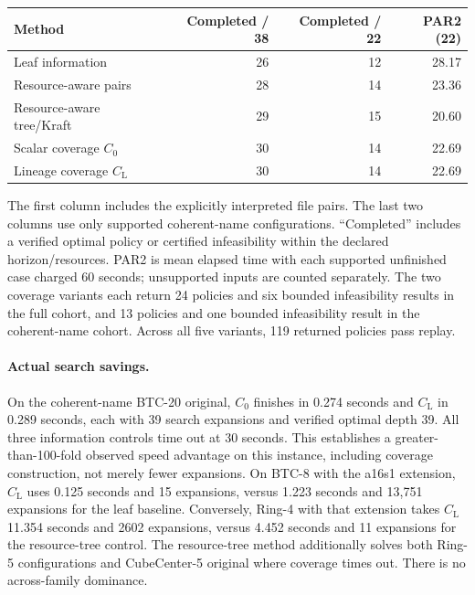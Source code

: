 \documentclass[11pt]{article}
\theoremstyle{definition}
\newcommand{\CL}{C_{\mathrm L}}
\begin{document}
\begin{center}
\begin{tabular}{lrrr}
\hline
Method & Completed / 38 & Completed / 22 & PAR2 (22) \\
\hline
Leaf information & 26 & 12 & 28.17 \\
Resource-aware pairs & 28 & 14 & 23.36 \\
Resource-aware tree/Kraft & 29 & 15 & 20.60 \\
Scalar coverage $C_0$ & 30 & 14 & 22.69 \\
Lineage coverage $\CL$ & 30 & 14 & 22.69 \\
\hline
\end{tabular}
\end{center}
The first column includes the explicitly interpreted file pairs. The last two
columns use only supported coherent-name configurations. ``Completed'' includes
a verified optimal policy or certified infeasibility within the declared
horizon/resources. PAR2 is mean elapsed time with each supported unfinished case
charged 60 seconds; unsupported inputs are counted separately. The two coverage
variants each return 24 policies and six bounded infeasibility results in the
full cohort, and 13 policies and one bounded infeasibility result in the
coherent-name cohort. Across all five variants, 119 returned policies pass replay.

\paragraph{Actual search savings.}
On the coherent-name BTC-20 original, $C_0$ finishes in 0.274 seconds and $\CL$
in 0.289 seconds, each with 39 search expansions and verified optimal depth 39.
All three information controls time out at 30 seconds. This establishes a
greater-than-100-fold observed speed advantage on this instance, including
coverage construction, not merely fewer expansions. On BTC-8 with the a16s1
extension, $\CL$ uses 0.125 seconds and 15 expansions, versus 1.223 seconds and
13,751 expansions for the leaf baseline. Conversely, Ring-4 with that extension
takes $\CL$ 11.354 seconds and 2602 expansions, versus 4.452 seconds and 11
expansions for the resource-tree control. The resource-tree method additionally
solves both Ring-5 configurations and CubeCenter-5 original where coverage times
out. There is no across-family dominance.
\end{document}
